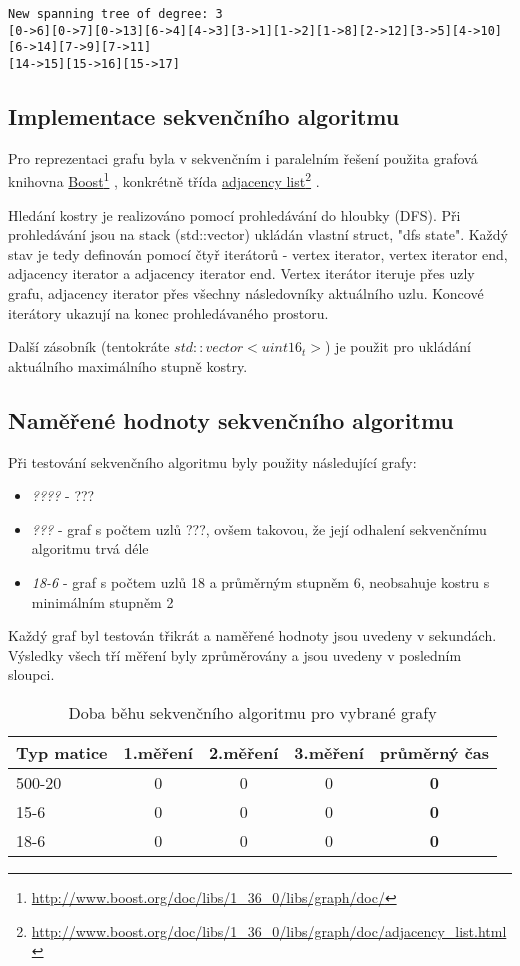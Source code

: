 \documentclass[]{article}
\newcommand\fnurl[2]{%
  \href{#2}{#1}\footnote{\url{#2}}%
}
\begin{document}
\begin{verbatim}
New spanning tree of degree: 3
[0->6][0->7][0->13][6->4][4->3][3->1][1->2][1->8][2->12][3->5][4->10][6->14][7->9][7->11]
[14->15][15->16][15->17]
\end{verbatim}

\subsection{Implementace sekvenčního algoritmu}
Pro reprezentaci grafu byla v sekvenčním i paralelním řešení použita grafová knihovna \fnurl{Boost}{http://www.boost.org/doc/libs/1_36_0/libs/graph/doc/}, konkrétně třída \fnurl{adjacency list}{http://www.boost.org/doc/libs/1_36_0/libs/graph/doc/adjacency_list.html}.

Hledání kostry je realizováno pomocí prohledávání do hloubky (DFS). Při prohledávání jsou na stack (std::vector) ukládán vlastní struct, "dfs state". Každý stav je tedy definován pomocí čtyř iterátorů - vertex iterator, vertex iterator end, adjacency iterator a adjacency iterator end. Vertex iterátor iteruje přes uzly grafu, adjacency iterator přes všechny následovníky aktuálního uzlu. Koncové iterátory ukazují na konec prohledávaného prostoru.

Další zásobník (tentokráte $std::vector<uint16_t>$) je použit pro ukládání aktuálního maximálního stupně kostry. 

\subsection{Naměřené hodnoty sekvenčního algoritmu}
Při testování sekvenčního algoritmu byly použity následující grafy:

\begin{itemize}
  \item \textit{????} - ???
  \item \textit{???} - graf s počtem uzlů ???, ovšem takovou, že její odhalení sekvenčnímu algoritmu trvá déle
  \item \textit{18-6} - graf s počtem uzlů 18 a průměrným stupněm 6, neobsahuje kostru s minimálním stupněm 2
\end{itemize}

Každý graf byl testován třikrát a naměřené hodnoty jsou uvedeny v sekundách. Výsledky všech tří měření byly zprůměrovány a jsou uvedeny v posledním sloupci.

\begin{table}[ht]
\centering
\begin{tabular}{|l|c|c|c|c|}
\hline \textbf{Typ matice} & \textbf{1.měření} & \textbf{2.měření} & \textbf{3.měření} & \textbf{průměrný čas} \\
\hline 
\hline 500-20 & 0 & 0 & 0 & \textbf{0} \\ 
\hline 15-6 & 0 & 0 & 0 & \textbf{0} \\ 
\hline 18-6 & 0 & 0 & 0 & \textbf{0} \\ 
\hline 
\end{tabular}
\caption{Doba běhu sekvenčního algoritmu pro vybrané grafy}
\label{sekvencni_test}	
\end{table}
\end{document}
